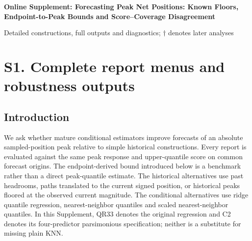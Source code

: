 \documentclass[11pt,a4paper]{article}
\begin{document}
\begin{center}\Large\bfseries Online Supplement: Forecasting Peak Net Positions: Known Floors, Endpoint-to-Peak Bounds and Score--Coverage Disagreement\end{center}
Detailed constructions, full outputs and diagnostics; \(\dagger\) denotes later analyses

\section*{S1. Complete report menus and robustness outputs}
\subsection*{Introduction}
We ask whether mature conditional estimators improve forecasts of an absolute sampled-position peak relative to simple historical constructions. Every report is evaluated against the same peak response and upper-quantile score on common forecast origins. The endpoint-derived bound introduced below is a benchmark rather than a direct peak-quantile estimate. The historical alternatives use past headrooms, paths translated to the current signed position, or historical peaks floored at the observed current magnitude. The conditional alternatives use ridge quantile regression, nearest-neighbor quantiles and scaled nearest-neighbor quantiles. In this Supplement, QR33 denotes the original regression and C2 denotes its four-predictor parsimonious specification; neither is a substitute for missing plain KNN.
\end{document}
